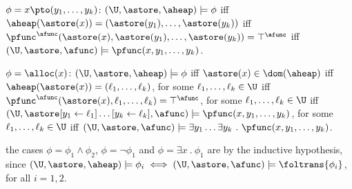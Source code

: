 {\begin{compactitem}
    \item $\phi = x \pto (y_1,\ldots,y_k)$: $(\U,\astore,\aheap)
      \models \phi$ iff $\aheap(\astore(x)) = (\astore(y_1), \ldots,
      \astore(y_k))$ iff $\pfunc^\afunc(\astore(x), \astore(y_1),
      \ldots, \astore(y_k)) = \top^\afunc$ iff $(\U,\astore,\afunc)
      \models \pfunc(x,y_1,\ldots,y_k)$.
    \item $\phi = \alloc(x)$: $(\U,\astore,\aheap) \models \phi$ iff
      $\astore(x) \in \dom(\aheap)$ iff $\aheap(\astore(x)) =
      (\ell_1,\ldots,\ell_k)$, for some $\ell_1,\ldots,\ell_k \in \U$
      iff $\pfunc^\afunc(\astore(x),\ell_1,\ldots,\ell_k) =
      \top^\afunc$, for some $\ell_1,\ldots,\ell_k \in \U$ iff
      $(\U,\astore[y_1 \leftarrow \ell_1] \ldots [y_k \leftarrow
        \ell_k],\afunc) \models \pfunc(x,y_1,\ldots,y_k)$, for some
      $\ell_1,\ldots,\ell_k \in \U$ iff $(\U,\astore,\afunc) \models
      \exists y_1 \ldots \exists y_k ~.~ \pfunc(x,y_1,\ldots,y_k)$.
    \item the cases $\phi = \phi_1 \wedge \phi_2$, $\phi = \neg\phi_1$
      and $\phi = \exists x ~.~ \phi_1$ are by the inductive
      hypothesis, since $(\U,\astore,\aheap) \models \phi_i \iff
      (\U,\astore,\afunc) \models \foltrans{\phi_i}$, for all $i =
      1,2$.
    \end{compactitem}         

}
